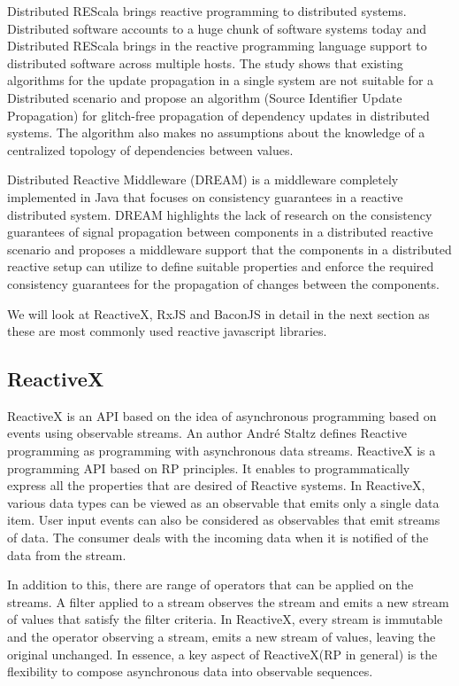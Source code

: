 Distributed REScala\cite{Drechsler:2014:DRU:2660193.2660240} brings reactive programming to distributed systems. Distributed software accounts to a huge chunk of software systems today and Distributed REScala brings in the reactive programming language support to distributed software across multiple hosts. The study\cite{Drechsler:2014:DRU:2660193.2660240} shows that existing algorithms for the update propagation in a single system are not suitable for a Distributed scenario and propose an algorithm (Source Identifier Update Propagation) for glitch-free propagation of dependency updates in distributed systems. The algorithm also makes no assumptions about the knowledge of a centralized topology of dependencies between values.

Distributed Reactive Middleware (DREAM) \cite{Margara:2014:WDD:2611286.2611290} is a middleware completely implemented in Java that focuses on consistency guarantees in a reactive distributed system. DREAM highlights the lack of research on the consistency guarantees of signal propagation between components in a distributed reactive scenario and proposes a middleware support that the components in a distributed reactive setup can utilize to define suitable properties and enforce the required consistency guarantees for the propagation of changes between the components.

We will look at ReactiveX, RxJS and BaconJS in detail in the next section as these are most commonly used reactive javascript libraries.

\subsection{ReactiveX}
ReactiveX is an API based on the idea of asynchronous programming based on events using observable streams. An author André Staltz defines Reactive programming as programming with asynchronous data streams\cite{introToRP}. ReactiveX is a programming API based on RP principles. It enables to programmatically express \cite{Doblander:2015:GEA:2675743.2776757} all the properties that are desired of Reactive systems\cite{reactiveManifesto}. In ReactiveX, various data types can be viewed as an observable that emits only a single data item. User input events can also be considered as observables that emit streams of data. The consumer deals with the incoming data when it is notified of the data from the stream.

In addition to this, there are range of operators that can be applied on the streams. A filter applied to a stream observes the stream and emits a new stream of values that satisfy the filter criteria. In ReactiveX, every stream is immutable and the operator observing a stream, emits a new stream of values, leaving the original unchanged. In essence, a key aspect of ReactiveX(RP in general) is the flexibility to compose \cite{Meyerovich:2009:FPL:1639949.1640091} asynchronous data into observable sequences.

